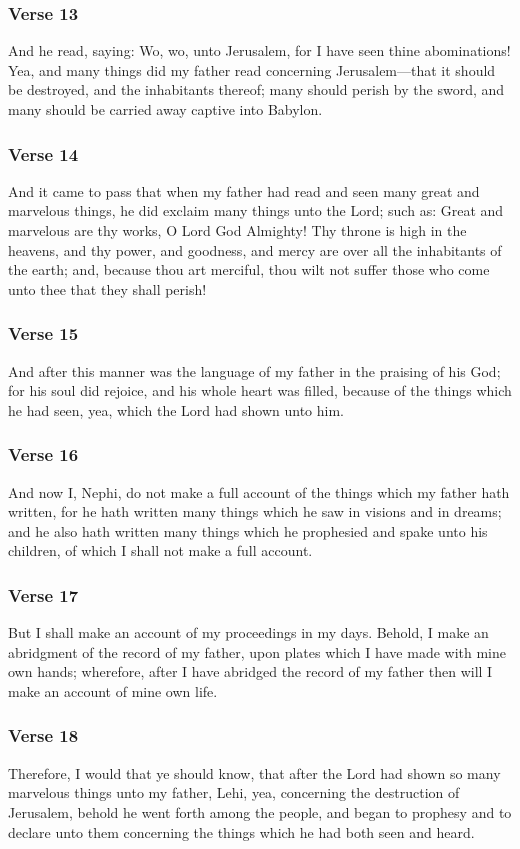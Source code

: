		\subsubsection{Verse 13}  And he read, saying: Wo, wo, unto Jerusalem, for I have seen thine abominations! Yea, and many things did my father read concerning Jerusalem—that it should be destroyed, and the inhabitants thereof; many should perish by the sword, and many should be carried away captive into Babylon.
		\subsubsection{Verse 14}  And it came to pass that when my father had read and seen many great and marvelous things, he did exclaim many things unto the Lord; such as: Great and marvelous are thy works, O Lord God Almighty!  Thy throne is high in the heavens, and thy power, and goodness, and mercy are over all the inhabitants of the earth; and, because thou art merciful, thou wilt not suffer those who come unto thee that they shall perish!
		\subsubsection{Verse 15}  And after this manner was the language of my father in the praising of his God; for his soul did rejoice, and his whole heart was filled, because of the things which he had seen, yea, which the Lord had shown unto him.
		\subsubsection{Verse 16}  And now I, Nephi, do not make a full account of the things which my father hath written, for he hath written many things which he saw in visions and in dreams; and he also hath written many things which he prophesied and spake unto his children, of which I shall not make a full account.
		\subsubsection{Verse 17}  But I shall make an account of my proceedings in my days.  Behold, I make an abridgment of the record of my father, upon plates which I have made with mine own hands; wherefore, after I have abridged the record of my father then will I make an account of mine own life.
		\subsubsection{Verse 18}  Therefore, I would that ye should know, that after the Lord had shown so many marvelous things unto my father, Lehi, yea, concerning the destruction of Jerusalem, behold he went forth among the people, and began to prophesy and to declare unto them concerning the things which he had both seen and heard.
